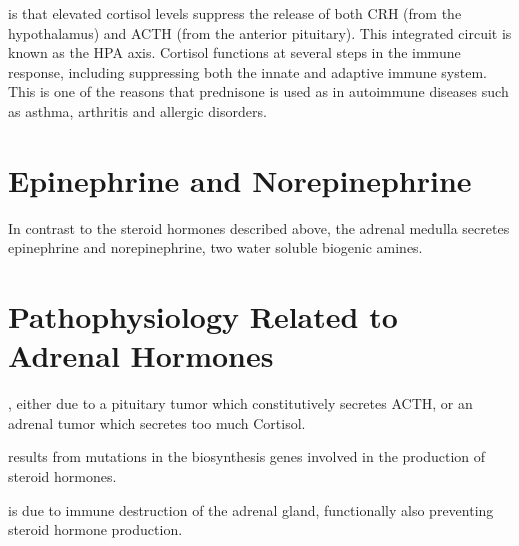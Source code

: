 \documentclass{tufte-handout}
\begin{document}
 is that elevated cortisol levels suppress the release of both CRH (from the hypothalamus) and ACTH (from the anterior pituitary).  This integrated circuit is known as the HPA axis.  Cortisol functions at several steps in the immune response, including suppressing both the innate and adaptive immune system.  This is one of the reasons that prednisone is used as in autoimmune diseases such as asthma, arthritis and allergic disorders.

\section{Epinephrine and Norepinephrine}

In contrast to the steroid hormones described above, the adrenal medulla secretes epinephrine and norepinephrine, two water soluble biogenic amines.

\section{Pathophysiology Related to Adrenal Hormones}

, either due to a pituitary tumor which constitutively secretes ACTH, or an adrenal tumor which secretes too much Cortisol.

 results from mutations in the biosynthesis genes involved in the production of steroid hormones.

 is due to immune destruction of the adrenal gland, functionally also preventing steroid hormone production.

\listoffigures
\listoftables



\end{document}
